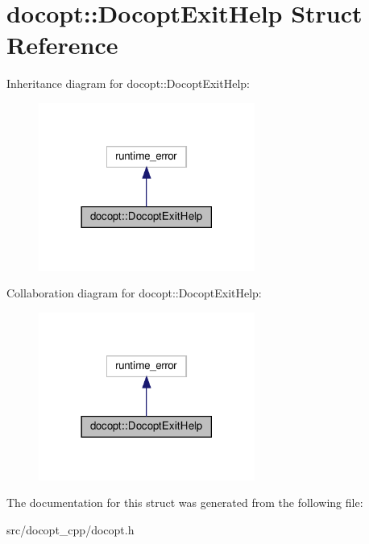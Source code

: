 \hypertarget{structdocopt_1_1DocoptExitHelp}{}\section{docopt\+:\+:Docopt\+Exit\+Help Struct Reference}
\label{structdocopt_1_1DocoptExitHelp}


Inheritance diagram for docopt\+:\+:Docopt\+Exit\+Help\+:
\nopagebreak
\begin{figure}[H]
\begin{center}
\leavevmode
\includegraphics[width=201pt]{structdocopt_1_1DocoptExitHelp__inherit__graph}
\end{center}
\end{figure}


Collaboration diagram for docopt\+:\+:Docopt\+Exit\+Help\+:
\nopagebreak
\begin{figure}[H]
\begin{center}
\leavevmode
\includegraphics[width=201pt]{structdocopt_1_1DocoptExitHelp__coll__graph}
\end{center}
\end{figure}


The documentation for this struct was generated from the following file\+:\begin{DoxyCompactItemize}
\item 
src/docopt\+\_\+cpp/docopt.\+h\end{DoxyCompactItemize}
